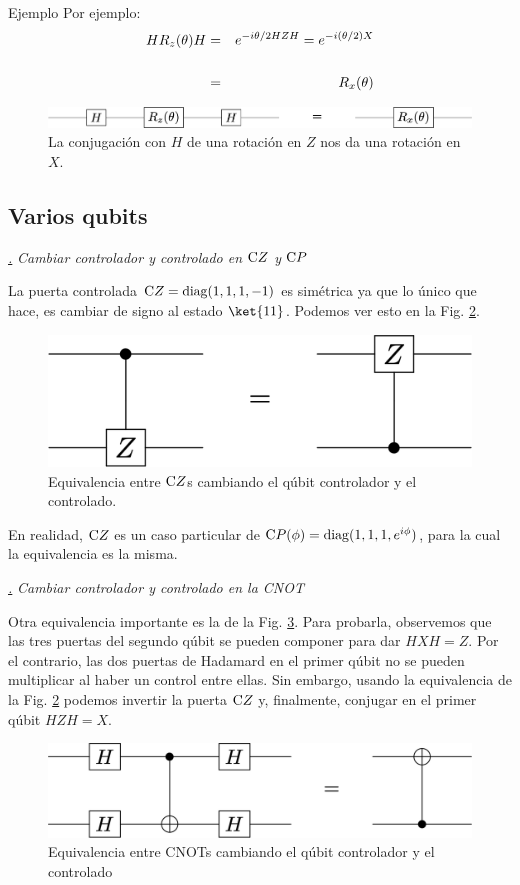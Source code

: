 \documentclass[a4paper,11pt]{book} %
\numberwithin{equation}{chapter}
\newcommand{\cg}[1]{{\rm C}#1}
\def\subsubiContadorIt{\par\addtocounter{subsubsection}{1}\underline{\it\thesubsubsection.}\hskip0.5cm \setcounter{subsubsubsectionIt}{0}}
\newcommand{\SubsubiIt}[1]{
		\subsubiContadorIt \textit{#1}
	}
\newcounter{subsubsubsectionIt}[subsubsection]
\begin{document}
	\begin{mybox_green}{Ejemplo}
	Por ejemplo:
	\begin{eqnarray*}
	H R_z(\theta) H &=& e^{-i \theta/2 HZH} =  e^{-i (\theta/2) X} \\ \rule{0mm}{8mm}
	&=& R_x(\theta)
	\end{eqnarray*}
		\begin{figure}[H]
		\centering 
		\includegraphics[width=0.70\linewidth]{Figuras/Fig_elementos_HRzHconjugation}
		\caption{La conjugación con $H$ de una rotación en $Z$ nos da una rotación en $X$.}
		\label{Fig_elementos_HRzHconjugation}
		\end{figure}
	\end{mybox_green}
	

        \subsection{Varios qubits}

			\SubsubiIt{Cambiar controlador y controlado en $\cg{Z}$ y $\cg{P}$}

La puerta  controlada $\cg{Z} =  {\rm diag}(1,1,1,-1)$   es simétrica ya que lo único que hace, es cambiar de signo al estado $\ket{11}$. Podemos ver esto en la Fig. \ref{Fig_elementos_Equiv_Z}.
	\begin{figure}[H]
	\centering 
	\includegraphics[width=0.35\linewidth]{Figuras/Fig_elementos_Equiv_Z}
	\caption{Equivalencia entre $\cg{Z}$s cambiando el qúbit controlador y el controlado.}
	\label{Fig_elementos_Equiv_Z}
	\end{figure}
 En realidad, $\cg{Z}$ es un caso particular de   $\cg{P(\phi)} = {\rm diag} (1,1,1, e^{i\phi})$, para la cual la equivalencia es la misma. 


			\SubsubiIt{Cambiar controlador y controlado en la CNOT} 
			
Otra equivalencia importante es la de la Fig. \ref{Fig_elementos_Equiv_HH}. Para probarla, observemos que las tres puertas del segundo qúbit se pueden componer para dar $HXH=Z$. Por el contrario, las dos puertas de Hadamard en el primer qúbit no se pueden multiplicar al haber un control entre ellas. Sin embargo, usando la  equivalencia de la Fig. \ref{Fig_elementos_Equiv_Z} podemos invertir la puerta $\cg{Z}$ y, finalmente, conjugar en el primer qúbit $HZH=X$.
	\begin{figure}[H]
	\centering 
	\includegraphics[width=0.45\linewidth]{Figuras/Fig_elementos_Equiv_HH}
	\caption{Equivalencia entre CNOTs cambiando el qúbit controlador y el controlado}
	\label{Fig_elementos_Equiv_HH}
	\end{figure}
\end{document}

